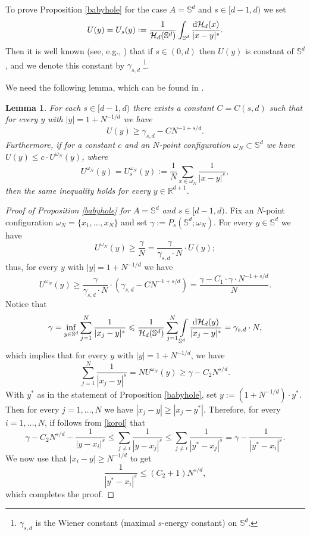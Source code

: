 \documentclass[12pt]{amsart}
\newtheorem{lemma}[theorem]{Lemma}
\theoremstyle{definition}
\def\sli{\sum\limits}
\def\ili{\int\limits}
\def\R{\mathbb{R}}
\newcommand{\1}{\mathbf{1}}
\def\H{\mathcal{H}}
\renewcommand\S{\mathbb{S}}
\begin{document}
To prove Proposition \ref{babyhole} for the case $A=\S^d$ and $s\in [d-1, d)$ we set 
$$
U(y)=U_s(y):=\frac{1}{\H_d(\S^d)}\int_{\S^d} \frac{\textup{d}\H_d(x)}{|x-y|^s}.
$$
Then it is well known (see, e.g., \cite{Landkof1972}) that if $s\in (0,d)$ then $U(y)$ is constant of $\mathbb{S}^d$, and we denote this constant by $\gamma_{s,d}$ \footnote{$\gamma_{s,d}$ is the Wiener constant (maximal $s$-energy constant) on $\mathbb{S}^d$.}. 

We need the following lemma, which can be found in \cite{Kuijlaars2007}.
\begin{lemma}
For each $s\in [d-1, d)$ there exists a constant $C=C(s,d)$ such that for every $y$ with $|y|=1+N^{-1/d}$ we have 
\begin{equation}
U(y)\geqslant \gamma_{s,d}-CN^{-1+s/d}.
\end{equation}
Furthermore, if for a constant $c$ and an $N$-point configuration $\omega_N\subset \mathbb{S}^d$ we have $U(y)\leqslant c\cdot U^{\omega_N}(y)$, where
$$
U^{\omega_N}(y)=U^{\omega_N}_s(y) := \frac{1}N\sli_{x\in \omega_N} \frac{1}{|x-y|^s},
$$
then the same inequality holds for every $y\in \R^{d+1}$.
\end{lemma}
\begin{proof}[Proof of Proposition \ref{babyhole} for $A=\S^d$ and $s\in [d-1, d)$]
Fix an $N$-point configuration $\omega_N=\{x_1, \ldots, x_N\}$ and set $\gamma:=P_s(\S^d; \omega_N)$. For every $y\in \S^d$ we have
$$
U^{\omega_N}(y)\geqslant \frac{\gamma}N = \frac{\gamma}{\gamma_{s,d}\cdot N} \cdot U(y);
$$
thus, for every $y$ with $|y|=1+N^{-1/d}$ we have
$$
U^{\omega_N}(y)\geqslant \frac{\gamma}{\gamma_{s,d}\cdot N} \cdot (\gamma_{s,d}-CN^{-1+s/d}) = \frac{\gamma - C_1 \cdot \gamma \cdot N^{-1+s/d}}{N}.
$$
Notice that 
$$
\gamma=\inf_{y\in \S^d}\sli_{j=1}^N \frac{1}{|x_j-y|^s} \leqslant \frac{1}{\H_d(\mathbb{S}^d)}\sli_{j=1}^N \ili_{\S^d}\frac{\textup{d}\H_d(y)}{|x_j-y|^s} = \gamma_{s,d}\cdot N,
$$
which implies that for every $y$ with $|y|=1+N^{-1/d}$, we have
\begin{equation}\label{korol}
\sli_{j=1}^N\frac{1}{|x_j-y|^s} = NU^{\omega_N}(y)\geqslant \gamma - C_2 N^{s/d}.
\end{equation}
With $y^*$ as in the statement of Proposition \ref{babyhole}, set $y:=(1+N^{-1/d})\cdot y^*$. Then for every $j=1,\ldots, N$ we have
$|x_j-y|\geqslant |x_j-y^*|$. Therefore, for every $i=1,\ldots, N$, if follows from \eqref{korol} that
$$
\gamma-C_2 N^{s/d} - \frac{1}{|y-x_i|^s} \leqslant \sli_{j\not = i}\frac{1}{|y-x_j|^s} \leqslant \sli_{j\not=i} \frac{1}{|y^*-x_j|^s} = \gamma - \frac{1}{|y^*-x_i|^s}.
$$
We now use that $|x_i-y|\geqslant N^{-1/d}$ to get
$$
\frac{1}{|y^*-x_i|^s}\leqslant (C_2+1)N^{s/d},
$$
which completes the proof. 
\end{proof}
\end{document}
